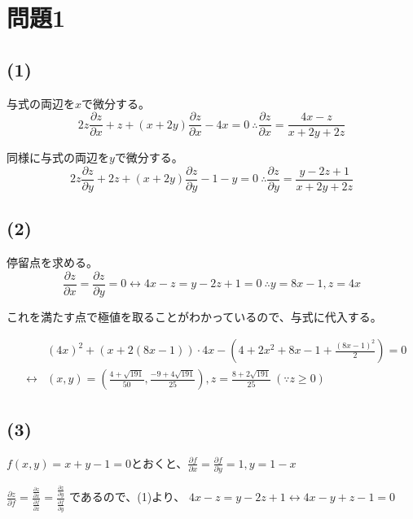 \documentclass[]{jsarticle}
\begin{document}
\section*{問題1}
    \subsection*{(1)}
        与式の両辺を$x$で微分する。
        \begin{equation*}
            2z\frac{\partial z}{\partial x} + z + (x + 2y)\frac{\partial z}{\partial x} - 4x = 0 \ \therefore \frac{\partial z}{\partial x} = \frac{4x - z}{x + 2y + 2z}
        \end{equation*}

        同様に与式の両辺を$y$で微分する。
        \begin{equation*}
            2z\frac{\partial z}{\partial y} + 2z + (x + 2y)\frac{\partial z}{\partial y} - 1 - y = 0 \ \therefore \frac{\partial z}{\partial y} = \frac{y - 2z + 1}{x + 2y + 2z}
        \end{equation*}
    \subsection*{(2)}
        停留点を求める。
        \begin{equation*}
            \frac{\partial z}{\partial x} = \frac{\partial z}{\partial y} = 0 \leftrightarrow 4x - z = y - 2z + 1 = 0 \ \therefore y = 8x - 1, z = 4x
        \end{equation*}

        これを満たす点で極値を取ることがわかっているので、与式に代入する。

        \begin{eqnarray}
            &&(4x)^2 + (x + 2(8x - 1))\cdot 4x - (4 + 2x^2+ 8x - 1 + \frac{(8x - 1)^2}{2}) = 0 \nonumber \\
            &\leftrightarrow& (x, y) = \left(\frac{4 + \sqrt{191}}{50}, \frac{-9 + 4\sqrt{191}}{25}\right), z = \frac{8 + 2\sqrt{191}}{25} \ (\because z \geq 0) \nonumber
        \end{eqnarray}
    \subsection*{(3)}
        $f(x,y) = x + y - 1 = 0$とおくと、$\displaystyle\frac{\partial f}{\partial x} = \frac{\partial f}{\partial y} = 1, y = 1 - x$

        $\displaystyle\frac{\partial z}{\partial f} = \frac{\displaystyle\frac{\partial z}{\partial x}}{\displaystyle\frac{\partial f}{\partial x}} = \frac{\displaystyle\frac{\partial z}{\partial y}}{\displaystyle\frac{\partial f}{\partial y}}$
        であるので、(1)より、
        $4x - z = y - 2z + 1 \leftrightarrow 4x - y + z - 1 = 0$
\end{document}
